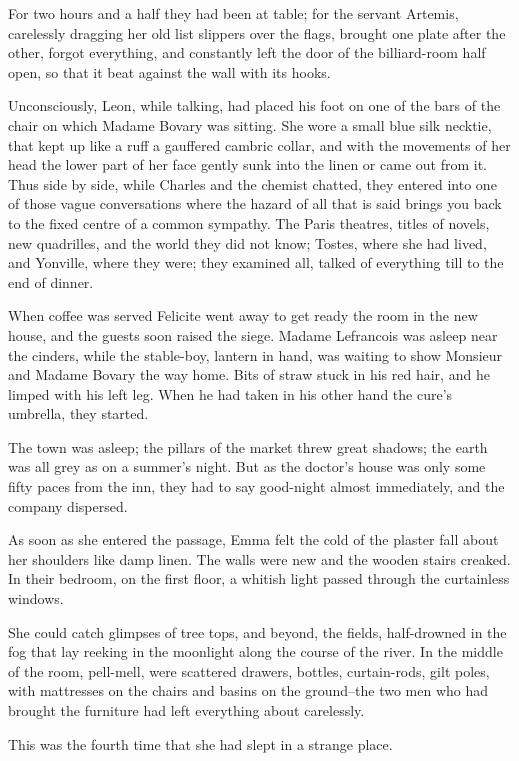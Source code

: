 \documentclass[11pt,twocolumn]{ltugboat}
\begin{document}
For two hours and a half they had been at table; for the servant
Artemis, carelessly dragging her old list slippers over the flags,
brought one plate after the other, forgot everything, and constantly
left the door of the billiard-room half open, so that it beat against
the wall with its hooks.

Unconsciously, Leon, while talking, had placed his foot on one of the
bars of the chair on which Madame Bovary was sitting. She wore a small
blue silk necktie, that kept up like a ruff a gauffered cambric collar,
and with the movements of her head the lower part of her face gently
sunk into the linen or came out from it. Thus side by side, while
Charles and the chemist chatted, they entered into one of those vague
conversations where the hazard of all that is said brings you back to
the fixed centre of a common sympathy. The Paris theatres, titles of
novels, new quadrilles, and the world they did not know; Tostes, where
she had lived, and Yonville, where they were; they examined all, talked
of everything till to the end of dinner.

When coffee was served Felicite went away to get ready the room in the
new house, and the guests soon raised the siege. Madame Lefrancois was
asleep near the cinders, while the stable-boy, lantern in hand, was
waiting to show Monsieur and Madame Bovary the way home. Bits of straw
stuck in his red hair, and he limped with his left leg. When he had
taken in his other hand the cure's umbrella, they started.

The town was asleep; the pillars of the market threw great shadows; the
earth was all grey as on a summer's night. But as the doctor's house was
only some fifty paces from the inn, they had to say good-night almost
immediately, and the company dispersed.

As soon as she entered the passage, Emma felt the cold of the plaster
fall about her shoulders like damp linen. The walls were new and the
wooden stairs creaked. In their bedroom, on the first floor, a whitish
light passed through the curtainless windows.

She could catch glimpses of tree tops, and beyond, the fields,
half-drowned in the fog that lay reeking in the moonlight along
the course of the river. In the middle of the room, pell-mell, were
scattered drawers, bottles, curtain-rods, gilt poles, with mattresses
on the chairs and basins on the ground--the two men who had brought the
furniture had left everything about carelessly.

This was the fourth time that she had slept in a strange place.
\end{document}
